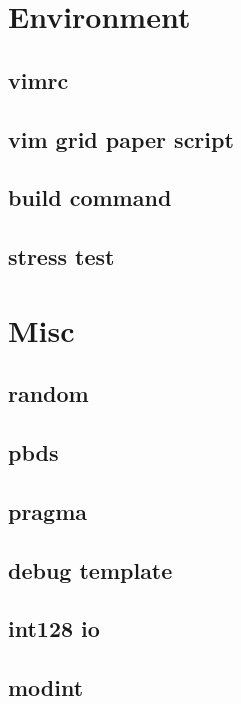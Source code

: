 \onehalfspacing
\tableofcontents
\singlespacing

\section{Environment}
\subsection{vimrc}

\subsection{vim grid paper script}

\subsection{build command}

\subsection{stress test}


\section{Misc}
\subsection{random}

\subsection{pbds}

\subsection{pragma}

\subsection{debug template}

\subsection{int128 io}

\subsection{modint}

